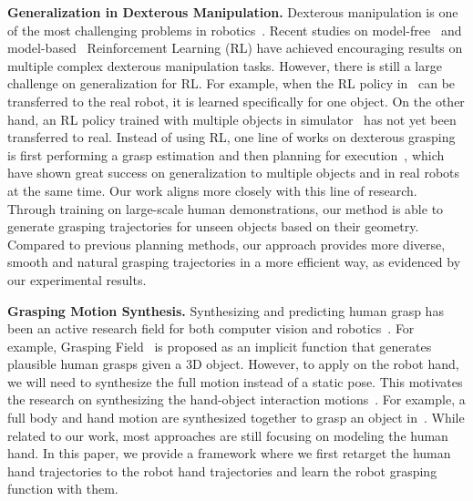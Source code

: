 \documentclass[letterpaper, 10 pt, journal, twoside]{IEEEtran}
\begin{document}
\textbf{Generalization in Dexterous Manipulation.} Dexterous manipulation is one of the most challenging problems in robotics~\cite{salisbury1982articulated,rus1999hand,okamura2000overview,Dogar2010,dafle2014extrinsic,calli2018path}. Recent studies on model-free~\cite{Openai2018,Openai2019,huang2021generalization,chen2022system} and model-based~\cite{kumar2016optimal,nagabandi2020deep} Reinforcement Learning (RL) have achieved encouraging results on multiple complex dexterous manipulation tasks.
However, there is still a large challenge on generalization for RL. For example, when the RL policy in~\cite{Openai2018} can be transferred to the real robot, it is learned specifically for one object. On the other hand, an RL policy trained with multiple objects in simulator~\cite{chen2022system} has not yet been transferred to real. Instead of using RL, one line of works on dexterous grasping is first performing a grasp estimation and then planning for execution~\cite{Andrews2013, varley2015generating, lu2020planning}, which have shown great success on generalization to multiple objects and in real robots at the same time.
Our work aligns more closely with this line of research. Through training on large-scale human demonstrations, our method is able to generate grasping trajectories for unseen objects based on their geometry.  Compared to previous planning methods, our approach provides more diverse, smooth and natural grasping trajectories in a more efficient way, as evidenced by our experimental results.

\textbf{Grasping Motion Synthesis.} Synthesizing and predicting human grasp has been an active research field for both computer vision and
robotics~\cite{DBLP:conf/rss/MorrisonLC18, brahmbhatt2019contactgrasp,karunratanakul2020grasping,jiang2021hand}.
For example, Grasping Field~\cite{karunratanakul2020grasping} is proposed as an implicit function that generates plausible human grasps given a 3D object. However, to apply on the robot hand, we will need to synthesize the full motion instead of a static pose. This motivates the research on synthesizing the hand-object interaction motions~\cite{hsiao2006imitation,ye2012synthesis,wu2021saga,taheri2022goal}.
For example, a full body and hand motion are synthesized together to grasp an object in~\cite{wu2021saga}. While related to our work, most approaches are still focusing on modeling the human hand. In this paper, we provide a framework where we first retarget the human hand trajectories to the robot hand trajectories and learn the robot grasping function with them.
\end{document}
